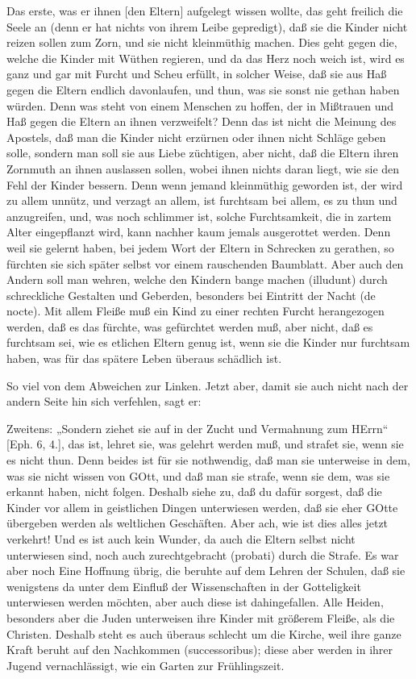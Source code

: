 Das erste, was er ihnen [den Eltern] aufgelegt wissen wollte, das geht freilich die Seele an (denn er hat nichts von ihrem Leibe gepredigt), daß sie die Kinder nicht reizen sollen zum Zorn, und sie nicht kleinmüthig machen. Dies geht gegen die, welche die Kinder mit Wüthen regieren, und da das Herz noch weich ist, wird es ganz und gar mit Furcht und Scheu erfüllt, in solcher Weise, daß sie aus Haß gegen die Eltern endlich davonlaufen, und thun, was sie sonst nie gethan haben würden. Denn was steht von einem Menschen zu hoffen, der in Mißtrauen und Haß gegen die Eltern an ihnen verzweifelt? Denn das ist nicht die Meinung des Apostels, daß man die Kinder nicht erzürnen oder ihnen nicht Schläge geben solle, sondern man soll sie aus Liebe züchtigen, aber nicht, daß die Eltern ihren Zornmuth an ihnen auslassen sollen, wobei ihnen nichts daran liegt, wie sie den Fehl der Kinder bessern. Denn wenn jemand kleinmüthig geworden ist, der wird zu allem unnütz, und verzagt an allem, ist furchtsam bei allem, es zu thun und anzugreifen, und, was noch schlimmer ist, solche Furchtsamkeit, die in zartem Alter eingepflanzt wird, kann nachher kaum jemals ausgerottet werden. Denn weil sie gelernt haben, bei jedem Wort der Eltern in Schrecken zu gerathen, so fürchten sie sich später selbst vor einem rauschenden Baumblatt. Aber auch den Andern soll man wehren, welche den Kindern bange machen (illudunt) durch schreckliche Gestalten und Geberden, besonders bei Eintritt der Nacht (de nocte). Mit allem Fleiße muß ein Kind zu einer rechten Furcht herangezogen werden, daß es das fürchte, was gefürchtet werden muß, aber nicht, daß es furchtsam sei, wie es etlichen Eltern genug ist, wenn sie die Kinder nur furchtsam haben, was für das spätere Leben überaus schädlich ist.

So viel von dem Abweichen zur Linken. Jetzt aber, damit sie auch nicht nach der andern Seite hin sich verfehlen, sagt er:

Zweitens: „Sondern ziehet sie auf in der Zucht und Vermahnung zum HErrn“ [Eph. 6, 4.], das ist, lehret sie, was gelehrt werden muß, und strafet sie, wenn sie es nicht thun. Denn beides ist für sie nothwendig, daß man sie unterweise in dem, was sie nicht wissen von GOtt, und daß man sie strafe, wenn sie dem, was sie erkannt haben, nicht folgen. Deshalb siehe zu, daß du dafür sorgest, daß die Kinder vor allem in geistlichen Dingen unterwiesen werden, daß sie eher GOtte übergeben werden als weltlichen Geschäften. Aber ach, wie ist dies alles jetzt verkehrt! Und es ist auch kein Wunder, da auch die Eltern selbst nicht unterwiesen sind, noch auch zurechtgebracht (probati) durch die Strafe. Es war aber noch Eine Hoffnung übrig, die beruhte auf dem Lehren der Schulen, daß sie wenigstens da unter dem Einfluß der Wissenschaften in der Gotteligkeit unterwiesen werden möchten, aber auch diese ist dahingefallen. Alle Heiden, besonders aber die Juden unterweisen ihre Kinder mit größerem Fleiße, als die Christen. Deshalb steht es auch überaus schlecht um die Kirche, weil ihre ganze Kraft beruht auf den Nachkommen (successoribus); diese aber werden in ihrer Jugend vernachlässigt, wie ein Garten zur Frühlingszeit.

